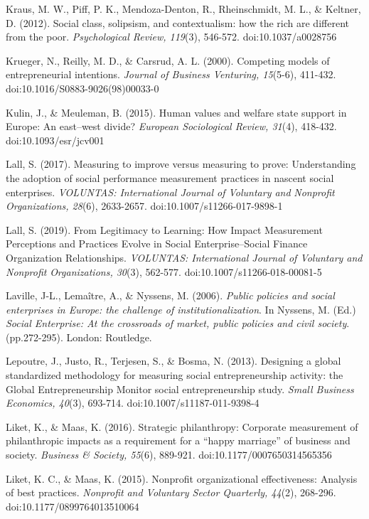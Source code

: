 \documentclass{article}
\begin{document}
Kraus, M. W., Piff, P. K., Mendoza-Denton, R., Rheinschmidt, M. L., \& Keltner, D. (2012). Social class, solipsism, and contextualism: how the rich are different from the poor. \emph{Psychological Review, 119}(3), 546-572. doi:10.1037/a0028756

Krueger, N., Reilly, M. D., \& Carsrud, A. L. (2000). Competing models of entrepreneurial intentions. \emph{Journal of Business Venturing, 15}(5-6), 411-432. doi:10.1016/S0883-9026(98)00033-0

Kulin, J., \& Meuleman, B. (2015). Human values and welfare state support in Europe: An east--west divide? \emph{European Sociological Review, 31}(4), 418-432. doi:10.1093/esr/jcv001

Lall, S. (2017). Measuring to improve versus measuring to prove: Understanding the adoption of social performance measurement practices in nascent social enterprises. \emph{VOLUNTAS: International Journal of Voluntary and }\emph{Nonprofit}\emph{ Organizations, 28}(6), 2633-2657. doi:10.1007/s11266-017-9898-1

Lall, S. (2019). From Legitimacy to Learning: How Impact Measurement Perceptions and Practices Evolve in Social Enterprise--Social Finance Organization Relationships. \emph{VOLUNTAS: International Journal of Voluntary and }\emph{Nonprofit}\emph{ Organizations, 30}(3), 562-577. doi:10.1007/s11266-018-00081-5

Laville, J-L., Lemaître, A., \& Nyssens, M. (2006). \emph{Public policies and social enterprises in Europe: the challenge of institutionalization}. In Nyssens, M. (Ed.) \emph{Social Enterprise: At the crossroads of market, public policies and civil society}. (pp.272-295). London: Routledge.

Lepoutre, J., Justo, R., Terjesen, S., \& Bosma, N. (2013). Designing a global standardized methodology for measuring social entrepreneurship activity: the Global Entrepreneurship Monitor social entrepreneurship study. \emph{Small Business Economics, 40}(3), 693-714. doi:10.1007/s11187-011-9398-4

Liket, K., \& Maas, K. (2016). Strategic philanthropy: Corporate measurement of philanthropic impacts as a requirement for a “happy marriage” of business and society. \emph{Business \& Society, 55}(6), 889-921. doi:10.1177/0007650314565356

Liket, K. C., \& Maas, K. (2015). Nonprofit organizational effectiveness: Analysis of best practices. \emph{Nonprofit}\emph{ and Voluntary Sector Quarterly, 44}(2), 268-296. doi:10.1177/0899764013510064
\end{document}
